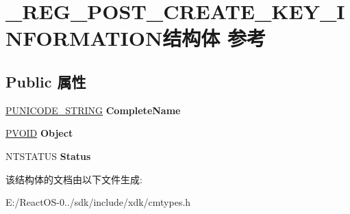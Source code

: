 \hypertarget{struct___r_e_g___p_o_s_t___c_r_e_a_t_e___k_e_y___i_n_f_o_r_m_a_t_i_o_n}{}\section{\+\_\+\+R\+E\+G\+\_\+\+P\+O\+S\+T\+\_\+\+C\+R\+E\+A\+T\+E\+\_\+\+K\+E\+Y\+\_\+\+I\+N\+F\+O\+R\+M\+A\+T\+I\+O\+N结构体 参考}
\label{struct___r_e_g___p_o_s_t___c_r_e_a_t_e___k_e_y___i_n_f_o_r_m_a_t_i_o_n}
\subsection*{Public 属性}
\begin{DoxyCompactItemize}
\item 
\mbox{\label{struct___r_e_g___p_o_s_t___c_r_e_a_t_e___k_e_y___i_n_f_o_r_m_a_t_i_o_n_a0edf4574d688453419790e8d05b116dc}} 
\hyperlink{struct___u_n_i_c_o_d_e___s_t_r_i_n_g}{P\+U\+N\+I\+C\+O\+D\+E\+\_\+\+S\+T\+R\+I\+NG} {\bfseries Complete\+Name}
\item 
\mbox{\label{struct___r_e_g___p_o_s_t___c_r_e_a_t_e___k_e_y___i_n_f_o_r_m_a_t_i_o_n_a466a3fbe27e0a32fbb81eab7660358f0}} 
\hyperlink{interfacevoid}{P\+V\+O\+ID} {\bfseries Object}
\item 
\mbox{\label{struct___r_e_g___p_o_s_t___c_r_e_a_t_e___k_e_y___i_n_f_o_r_m_a_t_i_o_n_a24afec56bdb1ca2913fb2d9e46080e80}} 
N\+T\+S\+T\+A\+T\+US {\bfseries Status}
\end{DoxyCompactItemize}


该结构体的文档由以下文件生成\+:\begin{DoxyCompactItemize}
\item 
E\+:/\+React\+O\+S-\/0../sdk/include/xdk/cmtypes.\+h\end{DoxyCompactItemize}
